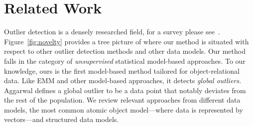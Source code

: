 {				\section{Related Work}
				Outlier detection is a densely researched field, for a survey please see~\citep{aggarwal2013,Akoglu2015}.
				Figure~\ref{fig:novelty} provides a tree picture of where our method is situated with respect to other outlier detection methods and other data models. 
				Our method falls in the category of {\em unsupervised} statistical model-based approaches. To our knowledge, ours is the first model-based method tailored for object-relational data. Like EMM and other model-based approaches, it detects {\em global outliers.} Aggarwal \citep{aggarwal2013} defines a global outlier to be a data point that notably deviates from the rest of the population. We review relevant approaches from different data models, the most common atomic object model---where data is represented by vectors---and structured data models.\\
				
}
